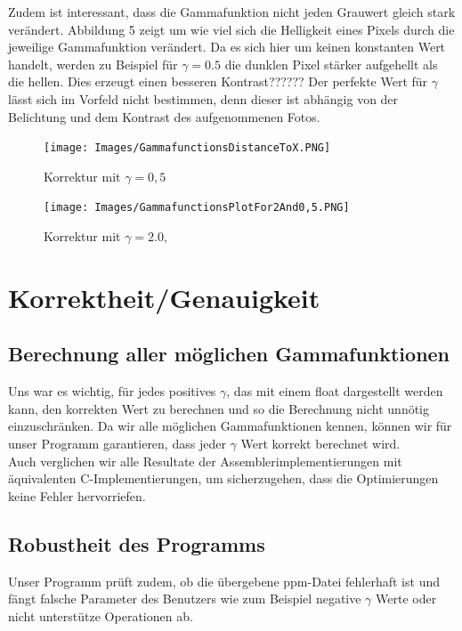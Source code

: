 \documentclass[course=erap]{aspdoc}
\begin{document}
\noindent
Zudem ist interessant, dass die Gammafunktion nicht jeden Grauwert gleich stark verändert. Abbildung 5 zeigt um wie viel sich die Helligkeit eines Pixels durch die jeweilige Gammafunktion verändert. Da es sich hier um keinen konstanten Wert handelt, werden zu Beispiel für $\gamma = 0.5$ die dunklen Pixel stärker aufgehellt als die hellen. Dies erzeugt einen besseren Kontrast??????
\newline
Der perfekte Wert für $\gamma$ lässt sich im Vorfeld nicht bestimmen, denn dieser ist abhängig von der Belichtung und dem Kontrast des aufgenommenen Fotos.
\begin{figure}[h]
    \begin{minipage}{0.49\linewidth}
        \centering
        \texttt{[image: Images/GammafunctionsDistanceToX.PNG]}
        \caption{Korrektur mit $\gamma = 0,5$}
    \end{minipage}
    \centering
    \begin{minipage}{0.49\linewidth}
        \centering
        \texttt{[image: Images/GammafunctionsPlotFor2And0,5.PNG]}
        \caption{Korrektur mit $\gamma = 2.0,$}
    \end{minipage}
\end{figure}
\section{Korrektheit/Genauigkeit}
\subsection{Berechnung aller möglichen Gammafunktionen}
Uns war es wichtig, für jedes positives $\gamma$, das mit einem float dargestellt werden kann, den korrekten Wert zu berechnen und so die Berechnung nicht unnötig einzuschränken. Da wir alle möglichen Gammafunktionen kennen, können wir für unser Programm garantieren, dass jeder $\gamma$ Wert korrekt berechnet wird. 
\\
Auch verglichen wir alle Resultate der Assemblerimplementierungen mit äquivalenten C-Implementierungen, um sicherzugehen, dass die Optimierungen keine Fehler hervorriefen.  
\subsection{Robustheit des Programms}
Unser Programm prüft zudem, ob die übergebene ppm-Datei fehlerhaft ist und fängt falsche Parameter des Benutzers wie zum Beispiel negative $\gamma$ Werte oder nicht unterstütze Operationen ab. 
\end{document}
